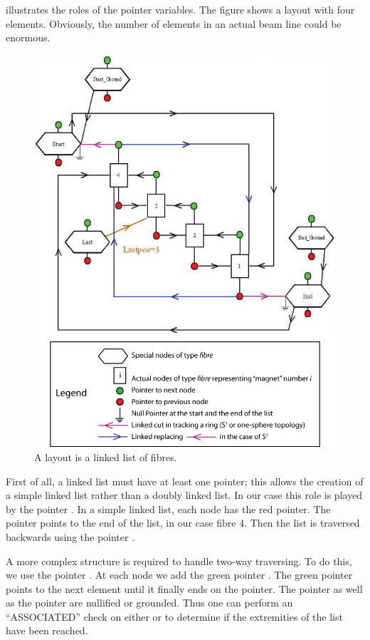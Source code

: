  illustrates the roles of the pointer
variables. The figure shows a layout with four elements. Obviously, the
number of elements in an actual beam line could be enormous.

\begin{figure}[ht]\forcerectofloat
  \centering
  \includegraphics[width=.9\textwidth]{illustrations/fibre}
  \caption{A layout is a linked list of fibres.}
  \label{fig:Layout-link-list-fibres}
\end{figure}

First of all, a linked list must have at least one pointer; this allows
the creation of a simple linked list rather than a doubly linked list.
In our case this role is played by the pointer . In
a simple linked list, each node has the red  pointer.
The pointer  points to the end of the list, in our case fibre 4.
Then the list is traversed backwards using the pointer .

A more complex structure is required to handle two-way traversing.
To do this, we use the pointer . At each node we add
the green pointer . The green pointer points to the next element
until it finally ends on the  pointer. The  pointer
as well as the  pointer are nullified or grounded. Thus one can
perform an ``ASSOCIATED'' check on either 
or  to determine if the extremities of the list have
been reached.

